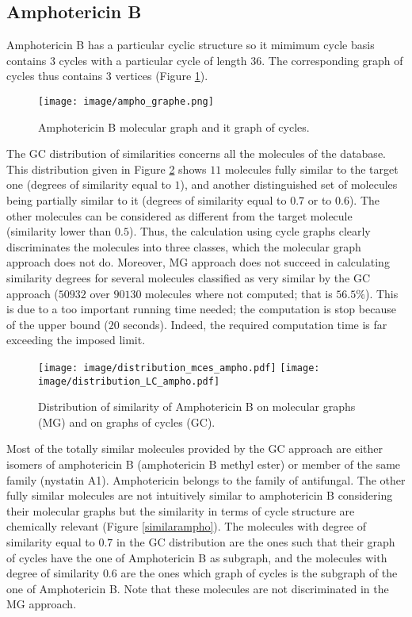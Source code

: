\documentclass[journal=jacsat,manuscript=article]{achemso}
\begin{document}
\subsection{Amphotericin B}
 
 Amphotericin B has a particular cyclic structure so it mimimum cycle basis contains $3$ cycles with a particular cycle of length $36$. The corresponding graph of cycles thus contains $3$ vertices  (Figure \ref{AmpB-st}).
 
 \begin{figure}[H]
 \begin{center}
\texttt{[image: image/ampho\_graphe.png]}  
\hspace{2cm}
\end{center}
\caption{Amphotericin B molecular graph and it graph of cycles.}
\label{AmpB-st}
 \end{figure}

The GC distribution of similarities concerns all the molecules of the database. This distribution given in Figure \ref{AmpB-dis} shows $11$ molecules fully similar to the target one (degrees of similarity equal to $1$), and another distinguished set of molecules being partially similar to it (degrees of similarity equal to $0.7$ or to $0.6$). The other molecules can be considered as different from the target molecule (similarity lower than $0.5$). Thus, the calculation using cycle graphs clearly discriminates the molecules into three classes, which the molecular graph approach does not do. Moreover, MG approach does not succeed in calculating similarity degrees for several molecules classified as very similar by the GC approach ($50932$ over $90130$ molecules where not computed; that is $56.5 \%$). This is due to a too important running time needed; the computation is stop because of the upper bound ($20$ seconds). Indeed, the required computation time is far exceeding the imposed limit.  
\begin{figure}[H]
 \begin{center}
\texttt{[image: image/distribution\_mces\_ampho.pdf]}  
\hspace{0.5cm}
 \texttt{[image: image/distribution\_LC\_ampho.pdf]} 
\end{center}
\caption{Distribution of similarity of Amphotericin B on molecular graphs (MG) and on graphs of cycles (GC).}
\label{AmpB-dis}
 \end{figure}
 Most of the totally similar molecules provided by the GC approach are either isomers of amphotericin B (amphotericin B methyl ester) or member of the same family (nystatin A1). Amphotericin belongs to the family of antifungal. The other fully similar molecules are not intuitively similar to amphotericin B considering their molecular graphs but the similarity in terms of cycle structure are chemically relevant (Figure \ref{similarampho}). The molecules with degree of similarity equal to $0.7$ in the GC distribution are the ones  such that their graph of cycles have the one of Amphotericin B as subgraph, and the molecules with degree of similarity $0.6$ are the ones which graph of cycles is the subgraph of the one of Amphotericin B. Note that these molecules are not discriminated in the MG approach.
\end{document}
